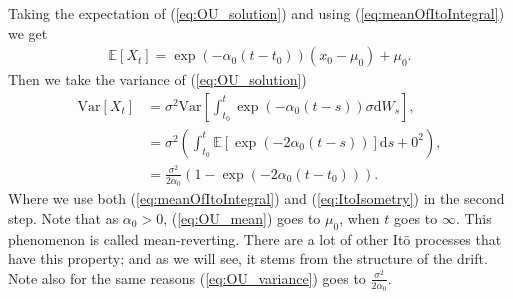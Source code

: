 Taking the expectation of (\ref{eq:OU_solution}) and using (\ref{eq:meanOfItoIntegral}) we get
\begin{align}
    \mathbb{E}\left[X_t\right] = \exp\left(-\alpha_0\left(t - t_0\right)\right)\left(x_0 - \mu_0\right) + \mu_0. \label{eq:OU_mean}
\end{align}
Then we take the variance of (\ref{eq:OU_solution})
\begin{align}
    \mathrm{Var}\left[X_t\right] &= \sigma^2\mathrm{Var}\left[\int_{t_0}^t \exp\left(-\alpha_0 \left(t - s\right)\right)\sigma \mathrm{d}W_s\right],\nonumber \\
    & = \sigma^2\left(\int_{t_0}^t \mathbb{E}\left[\exp\left(-2\alpha_0\left(t - s\right)\right)\right] \mathrm{d}s + 0^2 \right), \nonumber \\
    & = \frac{\sigma^2}{2\alpha_0}\left(1 - \exp\left(-2\alpha_0(t - t_0)\right)\right). \label{eq:OU_variance}
\end{align}
Where we use both (\ref{eq:meanOfItoIntegral}) and (\ref{eq:ItoIsometry}) in the second step. Note that as $\alpha_0 > 0$, (\ref{eq:OU_mean}) goes to $\mu_0$, when $t$ goes to $\infty$. This phenomenon is called mean-reverting. There are a lot of other Itō processes that have this property; and as we will see, it stems from the structure of the drift. Note also for the same reasons (\ref{eq:OU_variance}) goes to $\frac{\sigma^2}{2\alpha_0}$.
